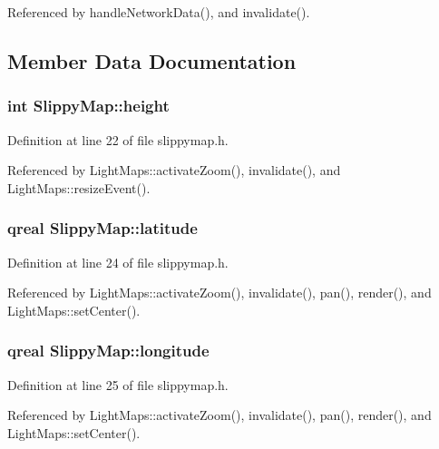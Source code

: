 Referenced by handle\-Network\-Data(), and invalidate().



\subsection{Member Data Documentation}
\hypertarget{classSlippyMap_aacec4be5e2b83eb2744a3b3b03c4af7a}{
\subsubsection[{height}]{\setlength{\rightskip}{0pt plus 5cm}int Slippy\-Map\-::height}}\label{classSlippyMap_aacec4be5e2b83eb2744a3b3b03c4af7a}


Definition at line 22 of file slippymap.\-h.



Referenced by Light\-Maps\-::activate\-Zoom(), invalidate(), and Light\-Maps\-::resize\-Event().

\hypertarget{classSlippyMap_a223220fdcbf2197845f009d48225c0c8}{
\subsubsection[{latitude}]{\setlength{\rightskip}{0pt plus 5cm}qreal Slippy\-Map\-::latitude}}\label{classSlippyMap_a223220fdcbf2197845f009d48225c0c8}


Definition at line 24 of file slippymap.\-h.



Referenced by Light\-Maps\-::activate\-Zoom(), invalidate(), pan(), render(), and Light\-Maps\-::set\-Center().

\hypertarget{classSlippyMap_af93efe003c192b7bc6a1ece6c7342de6}{
\subsubsection[{longitude}]{\setlength{\rightskip}{0pt plus 5cm}qreal Slippy\-Map\-::longitude}}\label{classSlippyMap_af93efe003c192b7bc6a1ece6c7342de6}


Definition at line 25 of file slippymap.\-h.



Referenced by Light\-Maps\-::activate\-Zoom(), invalidate(), pan(), render(), and Light\-Maps\-::set\-Center().

